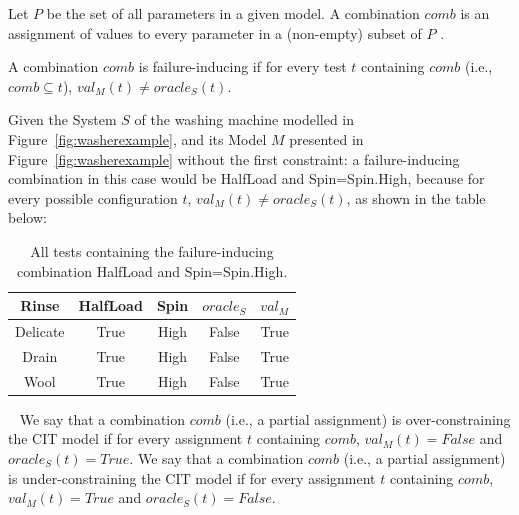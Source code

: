 \begin{tikzborder}{\cite{Gargantini16:validation}}
\begin{tikzborder}{\cite{gargantini_combinatorial_2017}}
\begin{tikzborder}{\cite{gargantini_combinatorial_2017}}
\bb
\begin{defn}[Combination]\label{def:cobo}
	Let $P$ be the set of all parameters in a given model. A combination $comb$ is an assignment of values to every parameter in a (non-empty) subset of $P$ . %
\end{defn}


\begin{defn}
	\label{def:failureinducing}
	A combination $comb$ is failure-inducing if for every test $t$ containing $comb$ (i.e., $comb \subseteq t$), $val_{M}(t) \neq \mathit{oracle}_{S}(t)$.
\end{defn}
\be

\begin{example}\label{ex:ficombo_constraining}
	\bb Given the System $S$ of the washing machine modelled in Figure~\ref{fig:washerexample}, and its Model $M$ presented in Figure~\ref{fig:washerexample} without the first constraint: a failure-inducing combination in this case would be HalfLoad and Spin=Spin.High, because for every possible configuration $t$, $val_M(t) \neq \mathit{oracle}_{S}(t)$, as shown in the table below:\be
	
	\begin{table}[h]
		\centering
		\begin{tabular}{ccc|cc}
			Rinse & HalfLoad & Spin & $\mathit{oracle}_{S}$ & $val_M$ \\
			\hline 
			Delicate & True & High & False & True \\ 
			Drain & True & High& False & True \\ 
			Wool & True & High & False & True \\
		\end{tabular} \label{tab:failureInducingExample} \caption{All tests containing the failure-inducing combination HalfLoad and Spin=Spin.High.}
	\end{table}
\end{example}

\bb
\begin{defn}\
	\label{def:correctness2} 
	We say that a combination $comb$ (i.e., a partial assignment) is over-constraining the CIT model if for every assignment $t$ containing $comb$,  $val_{M}(t)=\mathit{False}$ and $\mathit{oracle}_{S}(t)=\mathit{True}$.
	We say that a combination $comb$ (i.e., a partial assignment) is under-constraining the CIT model if for every assignment $t$ containing $comb$,  $val_{M}(t)=\mathit{True}$ and $\mathit{oracle}_{S}(t)=\mathit{False}$.
\end{defn}


\end{tikzborder}
\end{tikzborder}
\end{tikzborder}
